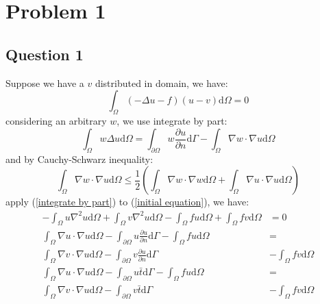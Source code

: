\section{Problem 1}

\subsection{Question 1}

Suppose we have a $v$ distributed in domain, 
we have:
\begin{equation}
    \label{initial equation}
    \int_\Omega (-\Delta u - f)(u-v)\mathrm{d}\Omega = 0
\end{equation}
considering an arbitrary $w$, we use integrate by part:
\begin{equation}
    \label{integrate by part}
    \int_\Omega w\Delta u \mathrm{d}\Omega = 
    \int_{\partial \Omega} w\frac{\partial u}{\partial n} \mathrm{d}\Gamma -
    \int_\Omega \nabla w \cdot \nabla u \mathrm{d}\Omega
\end{equation}
and by Cauchy-Schwarz inequality:
\begin{equation}
    \label{Cauchy-Schwarz inequality}
    \int_\Omega \nabla w \cdot \nabla u \mathrm{d}\Omega \leq
    \frac{1}{2}
    \left(\int_\Omega \nabla w \cdot \nabla w \mathrm{d}\Omega +
    \int_\Omega \nabla u \cdot \nabla u \mathrm{d}\Omega\right)
\end{equation}
apply (\ref{integrate by part}) to (\ref{initial equation}), we have:
\begin{equation}
    \begin{aligned}
        -\int_\Omega u \nabla^2 u \mathrm{d}\Omega + 
        \int_\Omega v \nabla^2 u \mathrm{d}\Omega -
        \int_\Omega f u \mathrm{d}\Omega +
        \int_\Omega f v \mathrm{d}\Omega &=0\\
        \int_\Omega \nabla u \cdot \nabla u \mathrm{d}\Omega -
        \int_{\partial \Omega} u\frac{\partial u}{\partial n} \mathrm{d}\Gamma -
        \int_\Omega f u \mathrm{d}\Omega &=\\
        \int_\Omega \nabla v \cdot \nabla u \mathrm{d}\Omega-
        \int_{\partial \Omega} v\frac{\partial u}{\partial n} \mathrm{d}\Gamma &-
        \int_\Omega f v \mathrm{d}\Omega\\
        \int_\Omega \nabla u \cdot \nabla u \mathrm{d}\Omega -
        \int_{\partial \Omega} u\bar{t} \mathrm{d}\Gamma -
        \int_\Omega f u \mathrm{d}\Omega &=\\
        \int_\Omega \nabla v \cdot \nabla u \mathrm{d}\Omega-
        \int_{\partial \Omega} v\bar{t} \mathrm{d}\Gamma &-
        \int_\Omega f v \mathrm{d}\Omega\\
    \end{aligned}
\end{equation}
